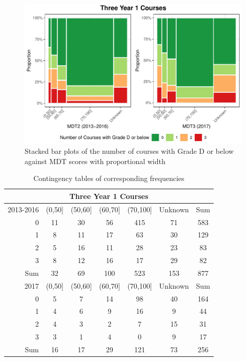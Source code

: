 \documentclass[a4paper]{report}
\begin{document}
\begin{figure}[H]
  \centering
  \includegraphics[width=\linewidth]{fig/REL_Y1Fs_vs_MDT_506070.pdf}
  \caption{\label{fig:REL_Y1Fs_vs_MDT_506070}Stacked bar plots of the number of courses with Grade D or below against MDT scores with proportional width}
\end{figure}

\begin{table}[ht]
  \centering
  \begin{tabular}{r|ccccc|c}
    \hline
    \multicolumn{7}{c}{\textbf{Three Year 1 Courses}} \\
    \hline
  2013-2016 & (0,50] & (50,60] & (60,70] & (70,100] & Unknown & Sum \\ 
    \hline
  0 & 11 & 30 & 56 & 415 & 71 & 583 \\ 
    1 & 8 & 11 & 17 & 63 & 30 & 129 \\ 
    2 & 5 & 16 & 11 & 28 & 23 & 83 \\ 
    3 & 8 & 12 & 16 & 17 & 29 & 82 \\ 
    \hline
    Sum & 32 & 69 & 100 & 523 & 153 & 877 \\ 
    \hline
    \hline
    2017 & (0,50] & (50,60] & (60,70] & (70,100] & Unknown & Sum \\ 
     \hline
   0 & 5 & 7 & 14 & 98 & 40 & 164 \\ 
     1 & 4 & 6 & 9 & 16 & 9 & 44 \\ 
     2 & 4 & 3 & 2 & 7 & 15 & 31 \\ 
     3 & 3 & 1 & 4 & 0 & 9 & 17 \\ 
    \hline
     Sum & 16 & 17 & 29 & 121 & 73 & 256 \\ 
      \hline
  \end{tabular}
  \caption{\label{tab:REL_Y1Fs_vs_MDT_506070}Contingency tables of corresponding frequencies}
\end{table}
\end{document}
